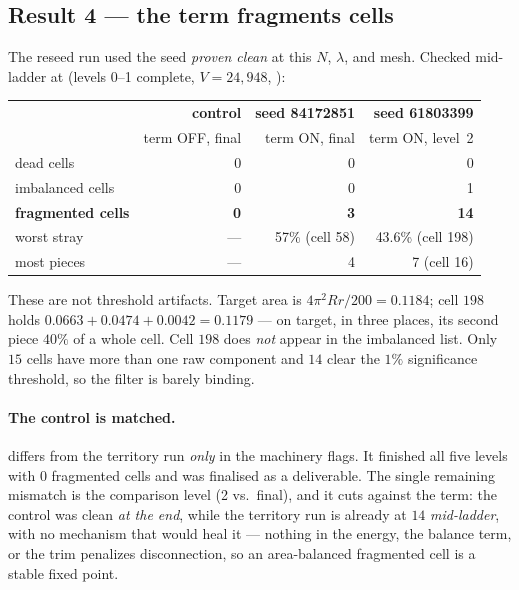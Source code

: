\documentclass[11pt,a4paper]{article}
\begin{document}
\subsection{Result 4 --- the term fragments cells}
The reseed run used the seed \emph{proven clean} at this \(N\), \(\lambda\), and
mesh. Checked mid-ladder at  (levels 0--1 complete,
\(V{=}24{,}948\), ):

\begin{center}\small
\begin{tabular}{@{}lrrr@{}}
\toprule
 & \textbf{control} & \textbf{seed 84172851} & \textbf{seed 61803399} \\
 & term OFF, final & term ON, final & term ON, level~2 \\
\midrule
dead cells        & 0            & 0            & 0 \\
imbalanced cells  & 0            & 0            & 1 \\
\textbf{fragmented cells} & \textbf{0} & \textbf{3} & \textbf{14} \\
worst stray       & ---          & 57\% (cell 58) & 43.6\% (cell 198) \\
most pieces       & ---          & 4            & 7 (cell 16) \\
\bottomrule
\end{tabular}
\end{center}

These are not threshold artifacts. Target area is
\(4\pi^2 R r/200 = 0.1184\); cell \(198\) holds
\(0.0663 + 0.0474 + 0.0042 = 0.1179\) --- on target, in three places, its second
piece \(40\%\) of a whole cell. Cell \(198\) does \emph{not} appear in the
imbalanced list. Only \(15\) cells have more than one raw component and \(14\)
clear the \(1\%\) significance threshold, so the filter is barely binding.

\paragraph{The control is matched.}  differs from the
territory run \emph{only} in the machinery flags. It finished all five levels with
\(0\) fragmented cells and was finalised as a deliverable. The single remaining
mismatch is the comparison level (2 vs.\ final), and it cuts against the term: the
control was clean \emph{at the end}, while the territory run is already at \(14\)
\emph{mid-ladder}, with no mechanism that would heal it --- nothing in the energy,
the balance term, or the trim penalizes disconnection, so an area-balanced
fragmented cell is a stable fixed point.
\end{document}
